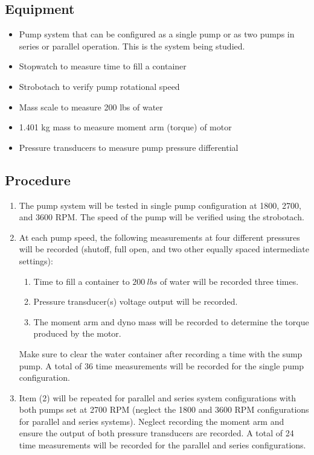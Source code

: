 \subsection{Equipment}
\begin{itemize}
    \item Pump system that can be configured as a single pump or as two pumps in series or parallel operation. This is the system being studied.
    \item Stopwatch to measure time to fill a container 
    \item Strobotach to verify pump rotational speed
    \item Mass scale to measure 200 lbs of water
    \item 1.401 kg mass to measure moment arm (torque) of motor
    \item Pressure transducers to measure pump pressure differential
\end{itemize}

\subsection{Procedure}
\begin{enumerate}[label=\arabic*.]
    \item The pump system will be tested in single pump configuration at 1800, 2700, and 3600 RPM. The speed of the pump will be verified using the strobotach.
    \item At each pump speed, the following measurements at four different pressures will be recorded (shutoff, full open, and two other equally spaced intermediate settings):
    \begin{enumerate}[label=\roman*.]
        \item Time to fill a container to $\qty{200}{lbs}$ of water will be recorded three times.
        \item Pressure transducer(s) voltage output will be recorded.
        \item The moment arm and dyno mass will be recorded to determine the torque produced by the motor.
    \end{enumerate}
    Make sure to clear the water container after recording a time with the sump pump. A total of 36 time measurements will be recorded for the single pump configuration.
    \item Item (2) will be repeated for parallel and series system configurations with both pumps set at 2700 RPM (neglect the 1800 and 3600 RPM configurations for parallel and series systems). Neglect recording the moment arm and ensure the output of both pressure transducers are recorded. A total of 24 time measurements will be recorded for the parallel and series configurations.
\end{enumerate} 